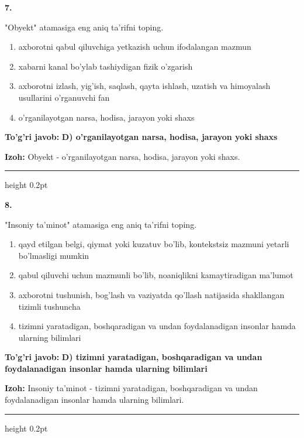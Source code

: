 \documentclass[10pt,a4paper,oneside]{article}
\begin{document}
\noindent\textbf{\color{ink}7.}
\par
"Obyekt" atamasiga eng aniq ta'rifni toping.
\begin{enumerate}[label=\Alph*),leftmargin=9mm]
\item axborotni qabul qiluvchiga yetkazish uchun ifodalangan mazmun
\item xabarni kanal bo'ylab tashiydigan fizik o'zgarish
\item axborotni izlash, yig'ish, saqlash, qayta ishlash, uzatish va himoyalash usullarini o'rganuvchi fan
\item o'rganilayotgan narsa, hodisa, jarayon yoki shaxs
\end{enumerate}
\begin{tcolorbox}[enhanced,breakable,colback=teal!4,colframe=teal!50!black,boxrule=0.5pt,arc=1.1mm,left=3mm,right=3mm,top=1.7mm,bottom=1.7mm,before skip=2mm,after skip=2mm]
\textbf{\color{teal}To'g'ri javob:} \textbf{D) o'rganilayotgan narsa, hodisa, jarayon yoki shaxs}
\par\smallskip
\textbf{Izoh:} Obyekt - o'rganilayotgan narsa, hodisa, jarayon yoki shaxs.
\end{tcolorbox}
\vspace{2mm}\hrule height 0.2pt \vspace{3mm}

\noindent\textbf{\color{ink}8.}
\par
"Insoniy ta'minot" atamasiga eng aniq ta'rifni toping.
\begin{enumerate}[label=\Alph*),leftmargin=9mm]
\item qayd etilgan belgi, qiymat yoki kuzatuv bo'lib, kontekstsiz mazmuni yetarli bo'lmasligi mumkin
\item qabul qiluvchi uchun mazmunli bo'lib, noaniqlikni kamaytiradigan ma'lumot
\item axborotni tushunish, bog'lash va vaziyatda qo'llash natijasida shakllangan tizimli tushuncha
\item tizimni yaratadigan, boshqaradigan va undan foydalanadigan insonlar hamda ularning bilimlari
\end{enumerate}
\begin{tcolorbox}[enhanced,breakable,colback=teal!4,colframe=teal!50!black,boxrule=0.5pt,arc=1.1mm,left=3mm,right=3mm,top=1.7mm,bottom=1.7mm,before skip=2mm,after skip=2mm]
\textbf{\color{teal}To'g'ri javob:} \textbf{D) tizimni yaratadigan, boshqaradigan va undan foydalanadigan insonlar hamda ularning bilimlari}
\par\smallskip
\textbf{Izoh:} Insoniy ta'minot - tizimni yaratadigan, boshqaradigan va undan foydalanadigan insonlar hamda ularning bilimlari.
\end{tcolorbox}
\vspace{2mm}\hrule height 0.2pt \vspace{3mm}
\end{document}
